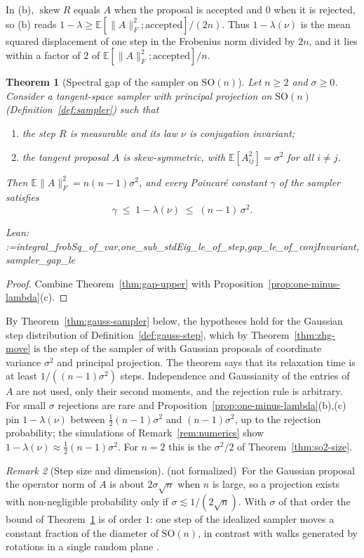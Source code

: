 \documentclass[11pt]{amsart}
\makeatletter
\newtheorem{theorem}{Theorem}[section]
\theoremstyle{definition}
\theoremstyle{remark}
\newtheorem{remark}[theorem]{Remark}
\newcommand{\@leanlist}[1]{\def\@leansep{}\@for\@leanname:=#1\do{\@leansep
  \texttt{\expandafter\detokenize\expandafter{\@leanname}}\def\@leansep{, }}}
\newcommand{\lean}[1]{\par\smallskip\noindent
  {\footnotesize\normalfont\raggedright\textsf{Lean:} \@leanlist{#1}\par}}
\newcommand{\notformal}{\textup{(not formalized)}}
\newcommand{\E}{\mathbb{E}}
\newcommand{\SO}{\mathrm{SO}}
\newcommand{\skw}{\operatorname{skew}}
\newcommand{\fro}[1]{\lVert #1\rVert_{F}}
\makeatother
\begin{document}
In (b), $\skw R$ equals $A$ when the proposal is accepted and $0$ when it is rejected, so (b)
reads $1-\lambda\ge\E[\fro{A}^2;\text{accepted}]/(2n)$.  Thus $1-\lambda(\nu)$ is the mean
squared displacement of one step in the Frobenius norm divided by $2n$, and it lies within a
factor of $2$ of $\E[\fro{A}^2;\text{accepted}]/n$.

\begin{theorem}[Spectral gap of the sampler on $\SO(n)$]\label{thm:sampler}
Let $n\ge2$ and $\sigma\ge0$.  Consider a tangent-space sampler with principal projection on
$\SO(n)$ (Definition~\ref{def:sampler}) such that
\begin{enumerate}
\item[(i)] the step $R$ is measurable and its law $\nu$ is conjugation invariant;
\item[(ii)] the tangent proposal $A$ is skew-symmetric, with $\E[A_{ij}^2]=\sigma^2$ for all
$i\ne j$.
\end{enumerate}
Then $\E\fro{A}^2=n(n-1)\sigma^2$, and every Poincar\'e constant $\gamma$ of the sampler
satisfies
\[
  \gamma\;\le\;1-\lambda(\nu)\;\le\;(n-1)\,\sigma^2 .
\]
\lean{integral_frobSq_of_var,one_sub_stdEig_le_of_step,gap_le_of_conjInvariant,sampler_gap_le}
\end{theorem}

\begin{proof}
Combine Theorem~\ref{thm:gap-upper} with Proposition~\ref{prop:one-minus-lambda}(c).
\end{proof}

By Theorem~\ref{thm:gauss-sampler} below, the hypotheses hold for the Gaussian step
distribution of Definition~\ref{def:gauss-step}, which by Theorem~\ref{thm:zhg-move} is the step
of the sampler of \cite{ZHG} with Gaussian proposals of coordinate variance $\sigma^2$ and
principal projection.  The theorem says that its relaxation time is at
least $1/((n-1)\sigma^2)$ steps.  Independence and Gaussianity of the entries of $A$ are not
used, only their second moments, and the rejection rule is arbitrary.  For small $\sigma$
rejections are rare and Proposition~\ref{prop:one-minus-lambda}(b),(c) pin $1-\lambda(\nu)$
between $\tfrac12(n-1)\sigma^2$ and $(n-1)\sigma^2$, up to the rejection probability; the
simulations of Remark~\ref{rem:numerics} show $1-\lambda(\nu)\approx\tfrac12(n-1)\sigma^2$.  For
$n=2$ this is the $\sigma^2/2$ of Theorem~\ref{thm:so2-size}.

\begin{remark}[Step size and dimension]
\notformal\ For the Gaussian proposal the operator norm of $A$ is about $2\sigma\sqrt n$ when
$n$ is large, so a projection exists with non-negligible probability only if
$\sigma\lesssim1/(2\sqrt n)$.  With $\sigma$ of that order the bound of
Theorem~\ref{thm:sampler} is of order $1$: one step of the idealized sampler moves a constant
fraction of the diameter of $\SO(n)$, in contrast with walks generated by rotations in a single
random plane \cite{Rosenthal}.
\end{remark}
\end{document}

